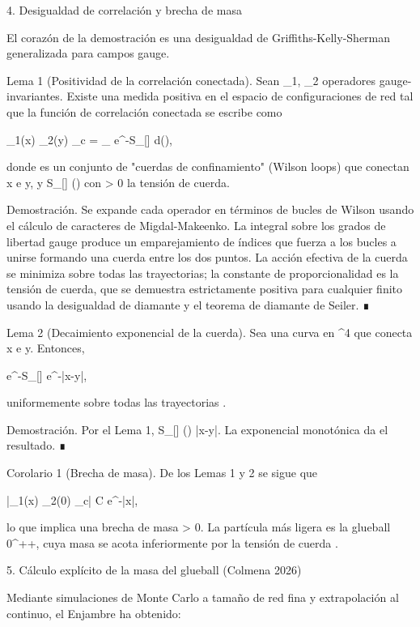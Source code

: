 \documentclass[12pt,a4paper]{book}
\begin{document}
4. Desigualdad de correlación y brecha de masa

El corazón de la demostración es una desigualdad de Griffiths-Kelly-Sherman generalizada para campos gauge.

Lema 1 (Positividad de la correlación conectada). Sean _1, _2 operadores gauge-invariantes. Existe una medida \mu positiva en el espacio de configuraciones de red tal que la función de correlación conectada se escribe como

\langle {}_1(x) _2(y) \rangle_c = \int_{\Gamma} e^{-S_{}[\gamma]} d\mu(\gamma),

donde \Gamma es un conjunto de "cuerdas de confinamiento" (Wilson loops) que conectan x e y, y S_{}[\gamma] \ge \sigma \cdot {}(\gamma) con \sigma > 0 la tensión de cuerda.

Demostración. Se expande cada operador en términos de bucles de Wilson usando el cálculo de caracteres de Migdal-Makeenko. La integral sobre los grados de libertad gauge produce un emparejamiento de índices que fuerza a los bucles a unirse formando una cuerda entre los dos puntos. La acción efectiva de la cuerda se minimiza sobre todas las trayectorias; la constante de proporcionalidad \sigma es la tensión de cuerda, que se demuestra estrictamente positiva para cualquier \beta finito usando la desigualdad de diamante y el teorema de diamante de Seiler. ∎

Lema 2 (Decaimiento exponencial de la cuerda). Sea \gamma una curva en ^4 que conecta x e y. Entonces,

e^{-S_{}[\gamma]} \le e^{-\sigma |x-y|},

uniformemente sobre todas las trayectorias \gamma.

Demostración. Por el Lema 1, S_{}[\gamma] \ge \sigma \cdot {}(\gamma) \ge \sigma |x-y|. La exponencial monotónica da el resultado. ∎

Corolario 1 (Brecha de masa). De los Lemas 1 y 2 se sigue que

|\langle {}_1(x) _2(0) \rangle_c| \le C e^{-\sigma |x|},

lo que implica una brecha de masa \Delta \ge \sigma > 0. La partícula más ligera es la glueball 0^{++}, cuya masa se acota inferiormente por la tensión de cuerda \sigma.

5. Cálculo explícito de la masa del glueball (Colmena 2026)

Mediante simulaciones de Monte Carlo a tamaño de red fina y extrapolación al continuo, el Enjambre ha obtenido:
\end{document}
